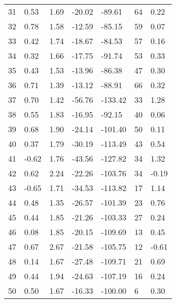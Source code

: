 \begin{appendices}
\begin{longtable}[c]{@{}lllllll@{}}
31 & 0.53 & 1.69 & -20.02 & -89.61 & 64 & 0.22 \\

32 & 0.78 & 1.58 & -12.59 & -85.15 & 59 & 0.07 \\

33 & 0.42 & 1.74 & -18.67 & -84.53 & 57 & 0.16 \\

34 & 0.32 & 1.66 & -17.75 & -91.74 & 53 & 0.33 \\

35 & 0.43 & 1.53 & -13.96 & -86.38 & 47 & 0.30 \\

36 & 0.71 & 1.39 & -13.12 & -88.91 & 66 & 0.32 \\

37 & 0.70 & 1.42 & -56.76 & -133.42 & 33 & 1.28 \\

38 & 0.55 & 1.83 & -16.95 & -92.15 & 40 & 0.06 \\

39 & 0.68 & 1.90 & -24.14 & -101.40 & 50 & 0.11 \\

40 & 0.37 & 1.79 & -30.19 & -113.49 & 43 & 0.54 \\

41 & -0.62 & 1.76 & -43.56 & -127.82 & 34 & 1.32 \\

42 & 0.62 & 2.24 & -22.26 & -103.76 & 34 & -0.19 \\

43 & -0.65 & 1.71 & -34.53 & -113.82 & 17 & 1.14 \\

44 & 0.48 & 1.35 & -26.57 & -101.39 & 23 & 0.76 \\

45 & 0.44 & 1.85 & -21.26 & -103.33 & 27 & 0.24 \\

46 & 0.08 & 1.85 & -20.15 & -109.69 & 13 & 0.45 \\

47 & 0.67 & 2.67 & -21.58 & -105.75 & 12 & -0.61 \\

48 & 0.14 & 1.67 & -27.48 & -109.71 & 21 & 0.69 \\

49 & 0.44 & 1.94 & -24.63 & -107.19 & 16 & 0.24 \\

50 & 0.50 & 1.67 & -16.33 & -100.00 & 6 & 0.30 \\


\end{longtable}
\end{appendices}
